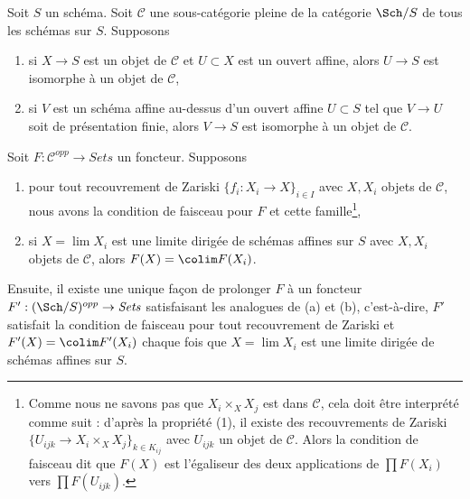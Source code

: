 \begin{lemma}
\label{lemma-extend}
Soit $S$ un schéma. Soit $\mathcal{C}$ une sous-catégorie pleine de la catégorie $\Sch/S$ de tous les schémas sur $S$. Supposons
\begin{enumerate}
\item si $X \to S$ est un objet de $\mathcal{C}$ et $U \subset X$ est un ouvert affine, alors $U \to S$ est isomorphe à un objet de $\mathcal{C}$,
\item si $V$ est un schéma affine au-dessus d'un ouvert affine $U \subset S$ tel que $V \to U$ soit de présentation finie, alors $V \to S$ est isomorphe à un objet de $\mathcal{C}$.
\end{enumerate}
Soit $F : \mathcal{C}^{opp} \to \textit{Sets}$ un foncteur. Supposons
\begin{enumerate}
\item[(a)] pour tout recouvrement de Zariski $\{f_i : X_i \to X\}_{i \in I}$ avec $X, X_i$ objets de $\mathcal{C}$, nous avons la condition de faisceau pour $F$ et cette famille\footnote{Comme nous ne savons pas que $X_i \times_X X_j$ est dans $\mathcal{C}$, cela doit être interprété comme suit : d'après la propriété (1), il existe des recouvrements de Zariski $\{U_{ijk} \to X_i \times_X X_j\}_{k \in K_{ij}}$ avec $U_{ijk}$ un objet de $\mathcal{C}$. Alors la condition de faisceau dit que $F(X)$ est l'égaliseur des deux applications de $\prod F(X_i)$ vers $\prod F(U_{ijk})$.},
\item[(b)] si $X = \lim X_i$ est une limite dirigée de schémas affines sur $S$ avec $X, X_i$ objets de $\mathcal{C}$, alors $F(X) = \colim F(X_i)$.
\end{enumerate}
Ensuite, il existe une unique façon de prolonger $F$ à un foncteur $F' : (\Sch/S)^{opp} \to \textit{Sets}$ satisfaisant les analogues de (a) et (b), c'est-à-dire, $F'$ satisfait la condition de faisceau pour tout recouvrement de Zariski et $F'(X) = \colim F'(X_i)$ chaque fois que $X = \lim X_i$ est une limite dirigée de schémas affines sur $S$.
\end{lemma}

